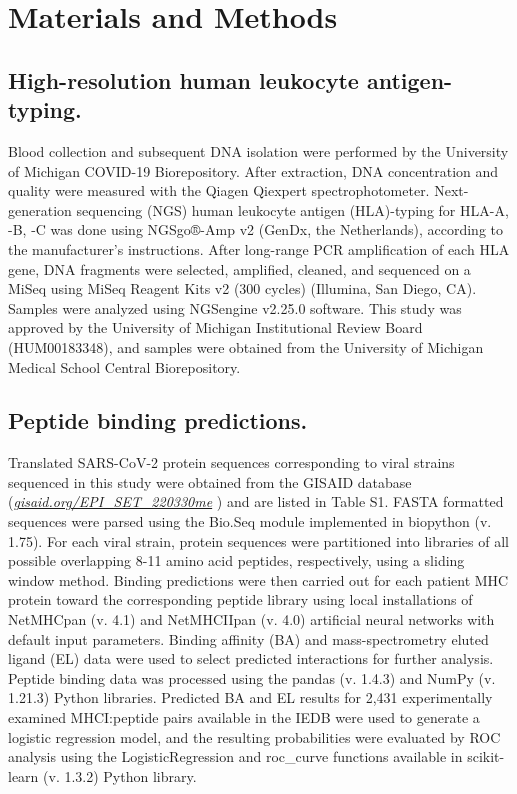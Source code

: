 \documentclass[utf8]{frontiersinFPHY_FAMS} %
\begin{document}
\section*{Materials and Methods}

\subsection*{High-resolution human leukocyte antigen-typing.} Blood collection and subsequent DNA isolation were performed by the University of Michigan COVID-19 Biorepository.  After extraction, DNA concentration and quality were measured with the Qiagen Qiexpert spectrophotometer.  Next-generation sequencing (NGS) human leukocyte antigen (HLA)-typing for HLA-A, -B, -C was done using NGSgo®-Amp v2 (GenDx, the Netherlands), according to the manufacturer’s instructions.  After long-range PCR amplification of each HLA gene, DNA fragments were selected, amplified, cleaned, and sequenced on a MiSeq using MiSeq Reagent Kits v2 (300 cycles) (Illumina, San Diego, CA). Samples were analyzed using NGSengine v2.25.0 software. This study was approved by the University of Michigan Institutional Review Board (HUM00183348), and samples were obtained from the University of Michigan Medical School Central Biorepository.  

\subsection*{Peptide binding predictions.} Translated SARS-CoV-2 protein sequences corresponding to viral strains sequenced in this study were obtained from the GISAID database (\textit{\href{https://gisaid.org/EPI_SET_220330me}{gisaid.org/EPI\_SET\_220330me}} ) \cite{34934514} and are listed in Table S1. FASTA formatted sequences were parsed using the Bio.Seq module implemented in biopython (v. 1.75). For each viral strain, protein sequences were partitioned into libraries of all possible overlapping 8-11 amino acid peptides, respectively, using a sliding window method. Binding predictions were then carried out for each patient MHC protein toward the corresponding peptide library using local installations of NetMHCpan (v. 4.1) and NetMHCIIpan (v. 4.0) artificial neural networks \citep{32406916} with default input parameters. Binding affinity (BA) and mass-spectrometry eluted ligand (EL) data were used to select predicted interactions for further analysis. Peptide binding data was processed using the pandas (v. 1.4.3) and NumPy (v. 1.21.3) Python libraries. Predicted BA and EL results for 2,431 experimentally examined MHCI:peptide pairs available in the IEDB were used to generate a logistic regression model, and the resulting probabilities were evaluated by ROC analysis using the LogisticRegression and roc\_curve functions available in scikit-learn (v. 1.3.2) Python library.
\end{document}
